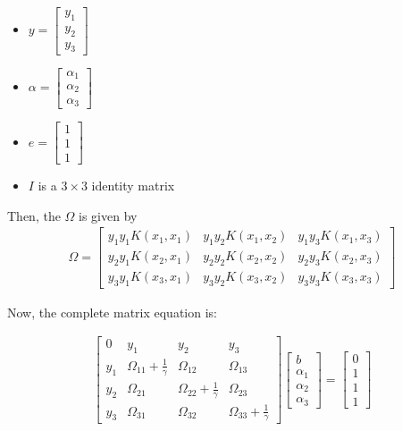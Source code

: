 \begin{itemize}
	\item $y = \begin{bmatrix} y_1 \\ y_2 \\ y_3 \end{bmatrix}$ 
	\item $\alpha = \begin{bmatrix} \alpha_1\\ \alpha_2 \\ \alpha_3 \end{bmatrix} $
	\item $e = \begin{bmatrix} 1 \\ 1 \\ 1 \end{bmatrix}$
	\item $I$ is a $3 \times 3$ identity matrix
\end{itemize}

Then, the $\Omega$ is given by
\begin{align*}
	\Omega = \begin{bmatrix}
	y_1 y_1 K(x_1, x_1) & y_1 y_2 K(x_1, x_2) & y_1 y_3 K(x_1, x_3) \\
	y_2 y_1 K(x_2, x_1) & y_2 y_2 K(x_2, x_2) & y_2 y_3 K(x_2, x_3) \\
	y_3 y_1 K(x_3, x_1) & y_3 y_2 K(x_3, x_2) & y_3 y_3 K(x_3, x_3)
	\end{bmatrix}
\end{align*}

Now, the complete matrix equation is:

\begin{align*}
	\begin{bmatrix}
	0 & y_1 & y_2 & y_3 \\
	y_1 & \Omega_{11} + \frac{1}{\gamma} & \Omega_{12} & \Omega_{13} \\
	y_2 & \Omega_{21} & \Omega_{22} + \frac{1}{\gamma} & \Omega_{23} \\
	y_3 & \Omega_{31} & \Omega_{32} & \Omega_{33} + \frac{1}{\gamma}
	\end{bmatrix}
	\begin{bmatrix}
	b \\
	\alpha_1 \\
	\alpha_2 \\
	\alpha_3
	\end{bmatrix}
	=
	\begin{bmatrix}
	0 \\
	1 \\
	1 \\
	1
	\end{bmatrix}
\end{align*}

